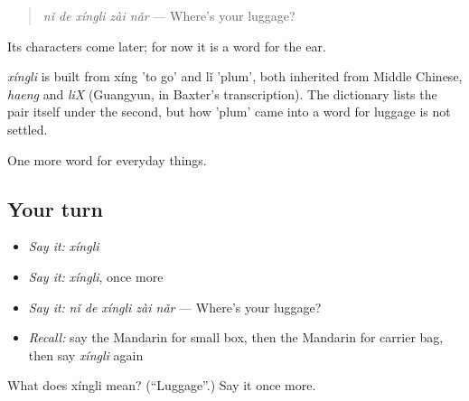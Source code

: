 \begin{quote}
\emph{nǐ de xíngli zài nǎr} — Where's your luggage?
\end{quote}

Its characters come later; for now it is a word for the ear.

\begin{cousinweb}
\emph{xíngli} is built from xíng 'to go' and lǐ 'plum', both inherited from Middle Chinese, \emph{haeng} and \emph{liX} (Guangyun, in Baxter's transcription). The dictionary lists the pair itself under the second, but how 'plum' came into a word for luggage is not settled.
\end{cousinweb}

\begin{grammarlens}[title={What you've built}]
One more word for everyday things.
\end{grammarlens}

\subsection*{Your turn}
\begin{itemize}
\raggedright
  \item \emph{Say it:} \emph{xíngli}
  \item \emph{Say it:} \emph{xíngli}, once more
  \item \emph{Say it:} \emph{nǐ de xíngli zài nǎr} — Where's your luggage?
  \item \emph{Recall:} say the Mandarin for small box, then the Mandarin for carrier bag, then say \emph{xíngli} again
\end{itemize}

\begin{tcolorbox}[breakable,colback=teal!4,colframe=teal!35!black,title={Before you move on}]
What does xíngli mean? (\textquotedblleft{}Luggage\textquotedblright{}.) Say it once more.
\end{tcolorbox}
